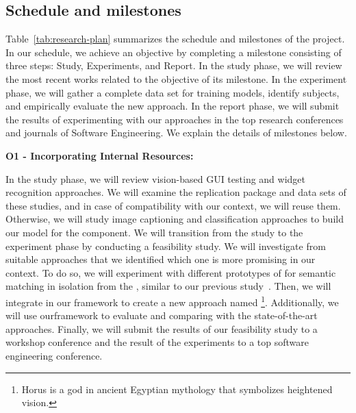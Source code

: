 \subsection{Schedule and milestones}



Table~\ref{tab:research-plan} summarizes the schedule and milestones of the \project project.
In our schedule, we achieve an objective by completing a milestone  consisting of three steps: Study, Experiments, and Report. 
 In the study phase, we will review the most recent works related to the objective of its milestone.
In the experiment phase, we will gather a complete data set for training models,  identify subjects, and empirically evaluate the new approach. 
In the report phase, we will submit the results of experimenting with our approaches in  the top research conferences and journals of Software Engineering.
We explain the details of milestones below.

\bigskip
\noindent
\textbf{O1 - Incorporating Internal Resources:}  

\bigskip
\noindent
In the study phase, we will review vision-based GUI testing  and widget recognition approaches. 
We will examine the replication package and data sets of these studies, and in case of compatibility with our context, we will reuse them. 
Otherwise, we will study image captioning and classification approaches to build our model for the \imagelabeler component.
%
We will transition from the study to the experiment phase by conducting a feasibility study. 
We will investigate from suitable approaches that we identified which one is more promising in our context.
To do so, we will experiment with different prototypes of \imagelabeler for semantic matching in isolation from the \testreuse,  similar to our previous study~\cite{mariani:SemFinder:ISSTA:2021}. 
Then, we will integrate \imagelabeler in our \tme framework to create a new \testreuse approach named \visiontool\footnote{Horus is a god in ancient Egyptian mythology that symbolizes heightened vision.}.
Additionally, we will use our\tme framework to evaluate \visiontool and comparing with the state-of-the-art \testreuse approaches.
Finally, we will submit the results of our  feasibility study to a workshop conference and the result of the \testreuse experiments to a top software engineering conference. 

